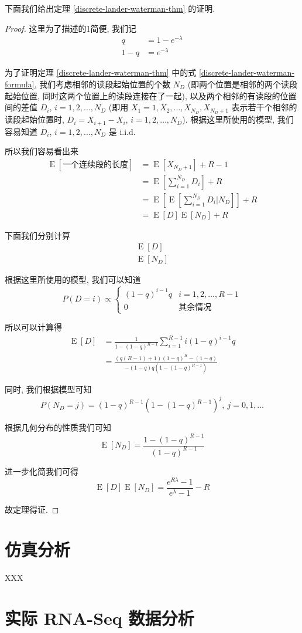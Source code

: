 下面我们给出定理 \ref{discrete-lander-waterman-thm} 的证明. 

\begin{proof}
这里为了描述的1简便, 我们记
\begin{align*}
q &= 1 - e^{-\lambda} \\
1-q &= e^{-\lambda}
\end{align*}

为了证明定理 \ref{discrete-lander-waterman-thm} 
中的式 \eqref{discrete-lander-waterman-formula}, 
我们考虑相邻的读段起始位置的个数 $N_D$ (即两个位置是相邻的两个读段起始位置, 
同时这两个位置上的读段连接在了一起), 
以及两个相邻的有读段的位置间的差值 $D_i$, $i=1,2,\ldots,N_D$ 
(即用 $X_1=1,X_2,\ldots,X_{N_D}, X_{N_D+1}$ 表示若干个相邻的读段起始位置时, 
$D_i=X_{i+1}-X_i$, $i=1,2,\ldots,N_D$). 
根据这里所使用的模型, 我们容易知道 $D_i$, $i=1,2,\ldots,N_D$ 是 i.i.d. 

所以我们容易看出来
\begin{align*}
\operatorname{E}[\text{一个连续段的长度}] &= \operatorname{E}[X_{N_D + 1}] +R-1 \\
&= \operatorname{E}[\sum_{i=1}^{N_D} D_i] +R \\
&= \operatorname{E}[\operatorname{E}[\sum_{i=1}^{N_D} D_i|N_D]] +R \\
&= \operatorname{E}[D] \operatorname{E}[N_D] +R
\end{align*}

下面我们分别计算
\begin{align*}
\operatorname{E}[D] \\
\operatorname{E}[N_D]
\end{align*}

根据这里所使用的模型, 我们可以知道
\[
P(D=i) \propto \begin{cases}
(1-q)^{i-1} q & i=1,2,\ldots,R-1 \\
0 & \text{其余情况}
\end{cases}
\]

所以可以计算得
\begin{align*}
\operatorname{E}[D] &= \frac{1}{1-(1-q)^{R-1}} \sum_{i=1}^{R-1} i (1-q)^{i-1} q \\
&= \frac{(q(R-1)+1)(1-q)^R-(1-q)}{-(1-q)q(1-(1-q)^{R-1})}
\end{align*}

同时, 我们根据模型可知
\[
P(N_D=j) = (1-q)^{R-1}(1-(1-q)^{R-1})^{j},\ j=0,1,\ldots
\]

根据几何分布的性质我们可知
\[
\operatorname{E}[N_D]=\frac{1-(1-q)^{R-1}}{(1-q)^{R-1}}
\]

进一步化简我们可得
\[
\operatorname{E}[D] \operatorname{E}[N_D] = \frac{e^{R\lambda} -1}{e^{\lambda}-1} -R
\]

故定理得证. 
\end{proof}

\section{仿真分析}
XXX

\section{实际 RNA-Seq 数据分析}


